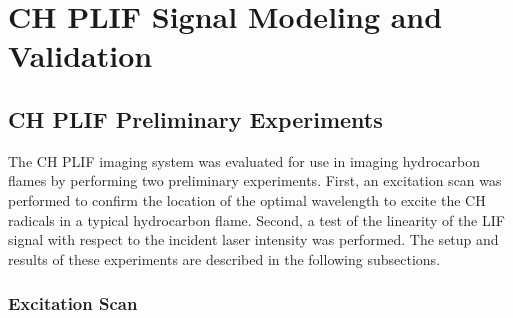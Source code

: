 \chapter{CH PLIF Signal Modeling and Validation}
\label{ch:chplif}






\section{CH PLIF Preliminary Experiments}
\label{sec:chplif-preliminary-experiments}

The CH PLIF imaging system was evaluated for use in imaging hydrocarbon flames by performing two preliminary experiments.
First, an excitation scan was performed to confirm the location of the optimal wavelength to excite the CH radicals in a typical hydrocarbon flame.
Second, a test of the linearity of the LIF signal with respect to the incident laser intensity was performed.
The setup and results of these experiments are described in the following subsections.

\subsection{Excitation Scan}
\label{subsec:prelim-excitation-scan}





